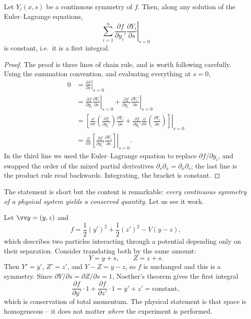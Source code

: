 \begin{theorem}
	Let $Y_i(x, s)$ be a continuous symmetry of $f$. Then, along any solution of the Euler--Lagrange equations,
	$$
	\left.\sum_{i=1}^n\frac{\partial f}{\partial y_i'}\frac{\partial Y_i}{\partial s}\right|_{s = 0}
	$$
	is constant, i.e.\ it is a first integral.
\end{theorem}
\begin{proof}
	The proof is three lines of chain rule, and is worth following carefully. Using the summation convention, and evaluating everything at $s = 0$,
	\begin{align*}
		0 &= \left.\frac{\partial f}{\partial s}\right|_{s = 0} \\
		&= \left.\frac{\partial f}{\partial y_i}\frac{\partial Y_i}{\partial s}\right|_{s=0} + \left.\frac{\partial f}{\partial y_i'}\frac{\partial Y_i'}{\partial s}\right|_{s=0} \\
		&= \left.\left[\frac{\dd}{\dd x}\left(\frac{\partial f}{\partial y_i'}\right)\frac{\partial Y_i}{\partial s} + \frac{\partial f}{\partial y_i'}\frac{\dd}{\dd x}\left(\frac{\partial Y_i}{\partial s}\right)\right]\right|_{s=0} \\
		&= \frac{\dd}{\dd x}\left.\left[\frac{\partial f}{\partial y_i'}\frac{\partial Y_i}{\partial s}\right]\right|_{s=0}.
	\end{align*}
	In the third line we used the Euler--Lagrange equation to replace $\partial f/\partial y_i$, and swapped the order of the mixed partial derivatives $\partial_s\partial_x = \partial_x\partial_s$; the last line is the product rule read backwards. Integrating, the bracket is constant.
\end{proof}

The statement is short but the content is remarkable: \emph{every continuous symmetry of a physical system yields a conserved quantity}. Let us see it work.

\begin{example}
	Let $\vv y = (y, z)$ and
	$$
	f = \frac{1}{2}(y')^2 + \frac{1}{2}(z')^2 - V(y - z),
	$$
	which describes two particles interacting through a potential depending only on their separation. Consider translating both by the same amount:
	$$
	Y = y + s, \qquad Z = z + s.
	$$
	Then $Y' = y'$, $Z' = z'$, and $Y - Z = y - z$, so $f$ is unchanged and this is a symmetry. Since $\partial Y/\partial s = \partial Z/\partial s = 1$, Noether's theorem gives the first integral
	$$
	\frac{\partial f}{\partial y'}\cdot 1 + \frac{\partial f}{\partial z'}\cdot 1 = y' + z' = \text{constant},
	$$
	which is conservation of total momentum. The physical statement is that space is homogeneous -- it does not matter \emph{where} the experiment is performed.
\end{example}

